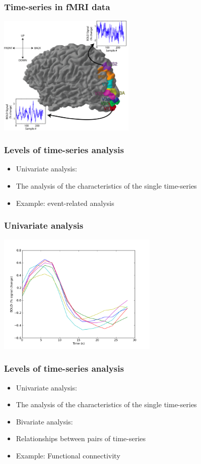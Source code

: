 \documentclass{beamer}
\begin{document}
\begin{frame}
\frametitle{Time-series in fMRI data}
\includegraphics[height=5.7cm]{figures/brain_w_tseries}
\end{frame}


\begin{frame}
\frametitle{Levels of time-series analysis}
\begin{itemize}
\pause
\item
Univariate analysis: 
\pause
\item 
The analysis of the characteristics of the single time-series
\pause
\item
Example: event-related analysis
\end{itemize}
\end{frame}

\begin{frame}
\frametitle{Univariate analysis}
\includegraphics[height=5.7cm]{figures/event_related_fmri_02}
\end{frame}

\begin{frame}
\frametitle{Levels of time-series analysis}
\begin{itemize}
\item
Univariate analysis: 
\item 
The analysis of the characteristics of the single time-series
\pause
\item
Bivariate analysis:
\pause
\item
Relationships between pairs of time-series
\pause
\item
Example: Functional connectivity
\end{itemize}
\end{frame}
\end{document}
